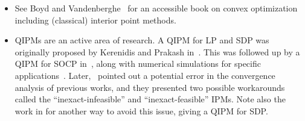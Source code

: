 \begin{refsection}
\begin{itemize}
    \item See Boyd and Vandenberghe~\cite{boyd2004ConvexOptimization} for an accessible book on convex optimization including (classical) interior point methods. 
    \item QIPMs are an active area of research. A QIPM for LP and SDP was originally proposed by Kerenidis and Prakash in~\cite{kerenidis2018QIntPoint}. This was followed up by a QIPM for SOCP in~\cite{kerenidis2019QAlgsSecondOrderConeSVM}, along with numerical simulations for specific applications~\cite{kerenidis2019QAlgsSecondOrderConeSVM,kerenidis2019PortfolioOptimization}. Later,~\cite{augustino2021quantum} pointed out a potential error in the convergence analysis of previous works, and they presented two possible workarounds called the ``inexact-infeasible'' and ``inexact-feasible'' IPMs. Note also the work in \cite{huang2022fasterQuantumIPM} for another way to avoid this issue, giving a QIPM for SDP. 
\end{itemize}
\printbibliography[heading=secbib,segment=\therefsegment]

\end{refsection}